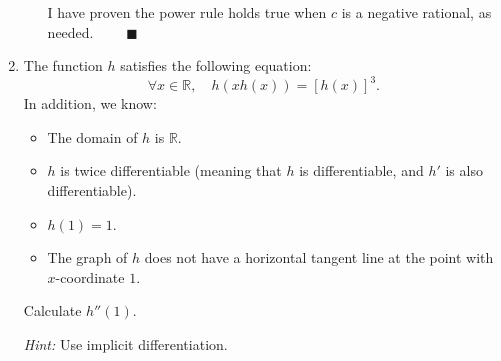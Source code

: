 \documentclass[12pt]{exam}
\newcommand {\DS} [1] {${\displaystyle #1}$}
\newcommand{\vv}{\vspace{.4cm}}
\newcommand{\R}{\mathbb{R}}
\begin{document}
\begin{enumerate}[resume]
\begin{enumerate}
		I have proven the power rule holds true when $c$ is a negative rational, as needed. $\quad \quad \blacksquare$
	
	
	\end{enumerate}



\vv
\newpage

\item   The function $h$ satisfies the following equation:
	$$ \forall x \in \R, \quad h(xh(x)) = \left[ h(x)\right]^3. $$
In addition, we know:
	\begin{itemize}
		\item The domain of $h$ is $\R$.
		\item $h$ is twice differentiable (meaning that $h$ is differentiable, and $h'$ is also differentiable).
		\item $h(1)=1$.
		\item The graph of $h$ does not have a horizontal tangent line at the point with $x$-coordinate $1$.
	\end{itemize}
	
	Calculate \DS{h''(1)}.
	
	\emph{Hint:} Use implicit differentiation.


\end{enumerate}
\end{document}
